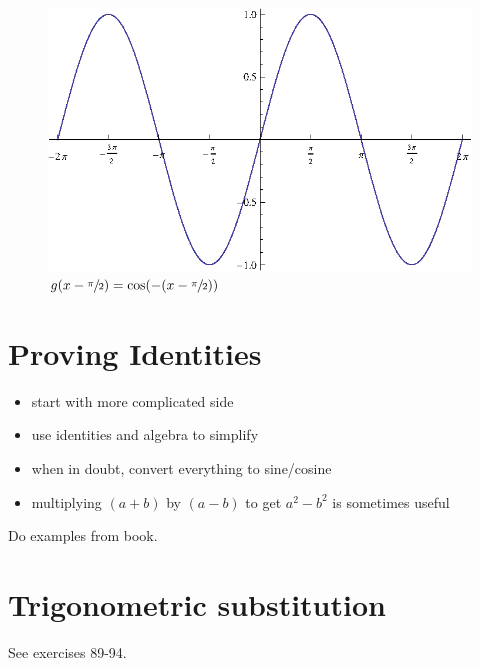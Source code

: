 \documentclass{exam}
\begin{document}
  \begin{figure}[H]
    \centering
    \includegraphics[scale=0.7]{sine_x}
    \caption{$g(x - \sfrac{\pi}{2}) = \cos(- ( x - \sfrac{\pi}{2}))$}
  \end{figure}

  \section{Proving Identities}

  \begin{itemize}
    \item start with more complicated side
    \item use identities and algebra to simplify
    \item when in doubt, convert everything to sine/cosine
    \item multiplying $(a + b)$ by $(a - b)$ to get $a^2 - b^2$ is sometimes useful
  \end{itemize}

  Do examples from book.

  \section{Trigonometric substitution}
  See exercises 89-94.  
\end{document}
